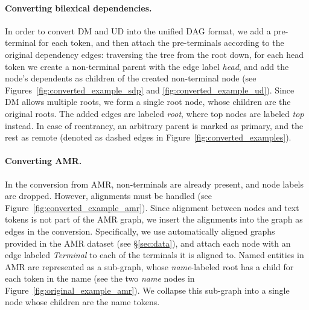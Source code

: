 \documentclass[11pt,a4paper]{article}
\begin{document}
\paragraph{Converting bilexical dependencies.}
In order to convert DM and UD into the unified DAG format,
we add a pre-terminal for each token,
and then attach the pre-terminals according to the original dependency edges:
traversing the tree from the root down, for each head token we create a non-terminal
parent with the edge label {\it head},
and add the node's dependents as children of the created non-terminal node
(see Figures~\ref{fig:converted_example_sdp} and \ref{fig:converted_example_ud}).
Since DM allows multiple roots, we form a single root node, whose children
are the original roots. The added edges are labeled \textit{root}, where
top nodes are labeled \textit{top} instead.
In case of reentrancy, an arbitrary parent is marked as primary, and the rest as remote
(denoted as dashed edges in Figure~\ref{fig:converted_examples}).

\paragraph{Converting AMR.}
In the conversion from AMR, non-terminals are already present, and node labels are dropped.
However, alignments must be handled (see Figure~\ref{fig:converted_example_amr}).
Since alignment between nodes and text tokens is not part of the AMR graph,
we insert the alignments into the graph as edges in the conversion.
Specifically, we use automatically aligned graphs provided in the AMR dataset (see \S\ref{sec:data}),
and attach each node with an edge labeled \textit{Terminal} to each of the terminals it is aligned to.
%
Named entities in AMR are represented as a sub-graph, whose \textit{name}-labeled root
has a child for each token in the name (see the two \textit{name} nodes in Figure~\ref{fig:original_example_amr}).
We collapse this sub-graph into a single node whose children are the name tokens.
\end{document}
